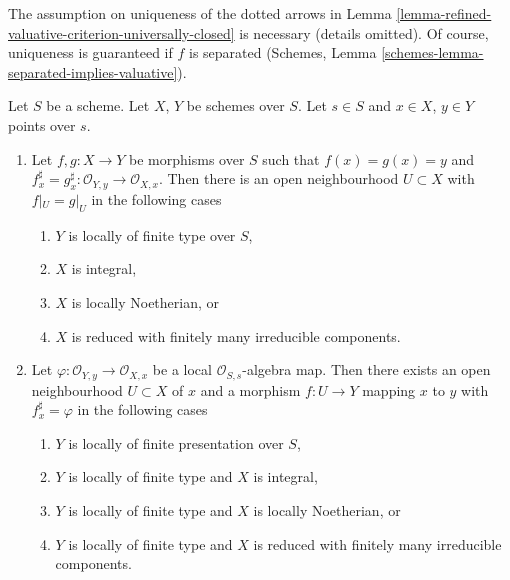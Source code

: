 \begin{remark}
\label{remark-check-val-on-open}
The assumption on uniqueness of the dotted arrows in
Lemma \ref{lemma-refined-valuative-criterion-universally-closed}
is necessary (details omitted). Of course, uniqueness is guaranteed if
$f$ is separated
(Schemes, Lemma \ref{schemes-lemma-separated-implies-valuative}).
\end{remark}

\begin{lemma}
\label{lemma-morphism-defined-local-ring}
Let $S$ be a scheme. Let $X$, $Y$ be schemes over $S$.
Let $s \in S$ and $x \in X$, $y \in Y$ points over $s$.
\begin{enumerate}
\item Let $f, g : X \to Y$ be morphisms over $S$ such that
$f(x) = g(x) = y$ and
$f^\sharp_x = g^\sharp_x : \mathcal{O}_{Y, y} \to \mathcal{O}_{X, x}$.
Then there is an open neighbourhood $U \subset X$ with
$f|_U = g|_U$ in the following cases
\begin{enumerate}
\item $Y$ is locally of finite type over $S$,
\item $X$ is integral,
\item $X$ is locally Noetherian, or
\item $X$ is reduced with finitely many irreducible components.
\end{enumerate}
\item Let $\varphi : \mathcal{O}_{Y, y} \to \mathcal{O}_{X, x}$
be a local $\mathcal{O}_{S, s}$-algebra map. Then there exists
an open neighbourhood $U \subset X$ of $x$ and a morphism $f : U \to Y$
mapping $x$ to $y$ with $f^\sharp_x = \varphi$ in the following cases
\begin{enumerate}
\item $Y$ is locally of finite presentation over $S$,
\item $Y$ is locally of finite type and $X$ is integral,
\item $Y$ is locally of finite type and $X$ is locally Noetherian, or
\item $Y$ is locally of finite type and $X$ is reduced with finitely
many irreducible components.
\end{enumerate}
\end{enumerate}
\end{lemma}

